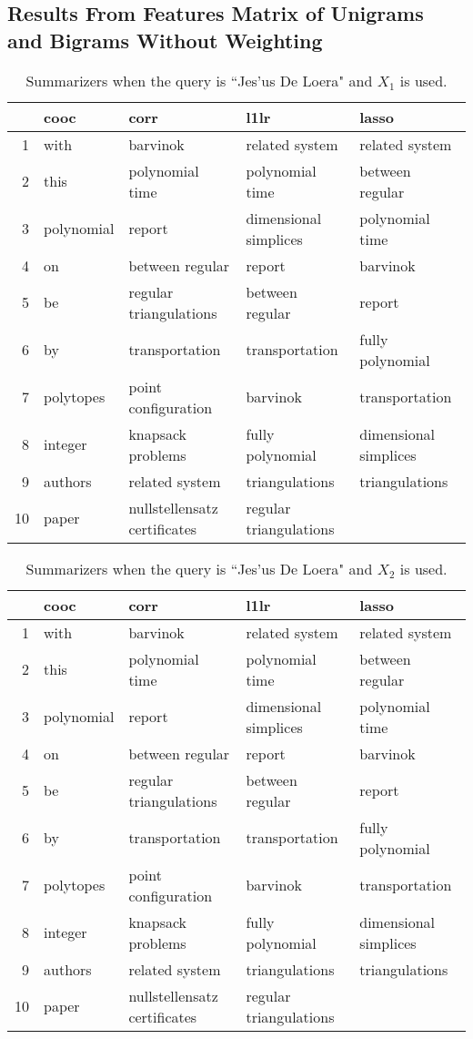 \documentclass{article}
\begin{document}
\subsection{Results From Features Matrix of Unigrams and Bigrams Without Weighting}
\begin{table}[H]
\begin{center}
\begin{tabular}{|r|llll|}
\hline
& cooc & corr & l1lr & lasso \\
\hline
1 & with & barvinok & related system & related system \\
2 & this & polynomial time & polynomial time & between regular \\
3 & polynomial & report & dimensional simplices & polynomial time \\
4 & on & between regular & report & barvinok \\
5 & be & regular triangulations & between regular & report \\
6 & by & transportation & transportation & fully polynomial \\
7 & polytopes & point configuration & barvinok & transportation \\
8 & integer & knapsack problems & fully polynomial & dimensional simplices \\
9 & authors & related system & triangulations & triangulations \\
10 & paper & nullstellensatz certificates & regular triangulations & \\
\hline
\end{tabular}
\end{center}
\caption{Summarizers when the query is ``Jes\a'us De Loera" and $X_1$ is used.}
\end{table}
\begin{table}[H]
\begin{center}
\begin{tabular}{|r|llll|}
\hline
& cooc & corr & l1lr & lasso \\
\hline
1 & with & barvinok & related system & related system \\
2 & this & polynomial time & polynomial time & between regular \\
3 & polynomial & report & dimensional simplices & polynomial time \\
4 & on & between regular & report & barvinok \\
5 & be & regular triangulations & between regular & report \\
6 & by & transportation & transportation & fully polynomial \\
7 & polytopes & point configuration & barvinok & transportation \\
8 & integer & knapsack problems & fully polynomial & dimensional simplices \\
9 & authors & related system & triangulations & triangulations \\
10 & paper & nullstellensatz certificates & regular triangulations & \\
\hline
\end{tabular}
\end{center}
\caption{Summarizers when the query is ``Jes\a'us De Loera" and $X_2$ is used.}
\end{table}
\end{document}
